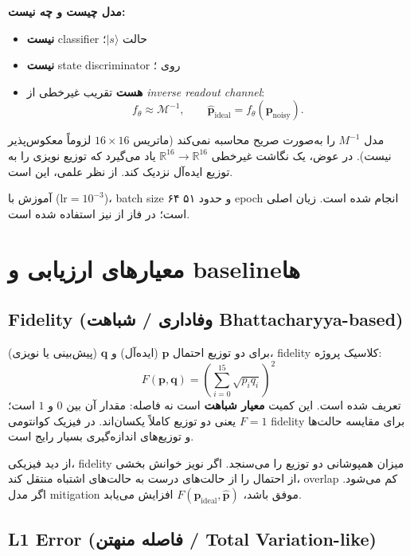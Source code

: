 \textbf{مدل  چیست و چه نیست:}
\begin{itemize}
	\item \textbf{نیست} classifier حالت $|s\rangle$؛
	\item \textbf{نیست} state discriminator روی ؛
	\item \textbf{هست} تقریب غیرخطی از \emph{inverse readout channel}:
	\[
		f_\theta \approx \mathcal{M}^{-1}, \qquad
		\hat{\mathbf{p}}_{\mathrm{ideal}} = f_\theta(\mathbf{p}_{\mathrm{noisy}}).
	\]
\end{itemize}

مدل $M^{-1}$ را به‌صورت صریح محاسبه نمی‌کند (ماتریس $16\times16$ لزوماً معکوس‌پذیر نیست). در عوض، یک نگاشت غیرخطی $\mathbb{R}^{16}\!\to\!\mathbb{R}^{16}$ یاد می‌گیرد که توزیع نویزی را به توزیع ایده‌آل نزدیک کند. از نظر علمی، این  است.

آموزش با  ($\text{lr}=10^{-3}$)، batch size ۶۴ و حدود ۵۱ epoch انجام شده است. زیان اصلی  است؛ در فاز  از  نیز استفاده شده است.

\section{معیارهای ارزیابی و baselineها}

\subsection{Fidelity (وفاداری / شباهت Bhattacharyya-based)}

برای دو توزیع احتمال $\mathbf{p}$ (ایده‌آل) و $\mathbf{q}$ (پیش‌بینی یا نویزی)، fidelity کلاسیک پروژه:
\begin{equation}
	F(\mathbf{p},\mathbf{q})
	=
	\left(\sum_{i=0}^{15}\sqrt{p_i q_i}\right)^2
	\label{eq:fidelity}
\end{equation}
تعریف شده است. این کمیت \textbf{معیار شباهت} است نه فاصله: مقدار آن بین $0$ و $1$ است؛ $F=1$ یعنی دو توزیع کاملاً یکسان‌اند. در فیزیک کوانتومی fidelity برای مقایسه حالت‌ها و توزیع‌های اندازه‌گیری بسیار رایج است.

از دید فیزیکی، fidelity میزان همپوشانی دو توزیع را می‌سنجد. اگر نویز خوانش بخشی از احتمال را از حالت‌های درست به حالت‌های اشتباه منتقل کند، overlap کم می‌شود. اگر مدل mitigation موفق باشد، $F(\mathbf{p}_{\mathrm{ideal}}, \hat{\mathbf{p}})$ افزایش می‌یابد.

\subsection{L1 Error (فاصله منهتن / Total Variation-like)}

